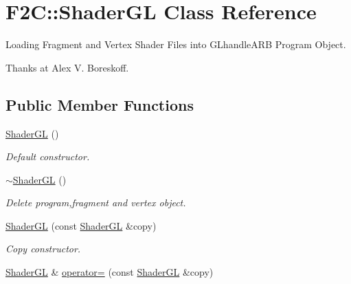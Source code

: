 \hypertarget{class_f2_c_1_1_shader_g_l}{
\section{F2C::ShaderGL Class Reference}
\label{class_f2_c_1_1_shader_g_l}
}


Loading Fragment and Vertex Shader Files into GLhandleARB Program Object. \par
 \par
 Thanks at Alex V. Boreskoff.  


\subsection*{Public Member Functions}
\begin{DoxyCompactItemize}
\item 
\hypertarget{class_f2_c_1_1_shader_g_l_a199175c733789ae58dc412cd717f2656}{
\hyperlink{class_f2_c_1_1_shader_g_l_a199175c733789ae58dc412cd717f2656}{ShaderGL} ()}
\label{class_f2_c_1_1_shader_g_l_a199175c733789ae58dc412cd717f2656}

\begin{DoxyCompactList}\small\item\em Default constructor. \item\end{DoxyCompactList}\item 
\hypertarget{class_f2_c_1_1_shader_g_l_ac45578d727ac4383bc3bc84804d99323}{
\hyperlink{class_f2_c_1_1_shader_g_l_ac45578d727ac4383bc3bc84804d99323}{$\sim$ShaderGL} ()}
\label{class_f2_c_1_1_shader_g_l_ac45578d727ac4383bc3bc84804d99323}

\begin{DoxyCompactList}\small\item\em Delete program,fragment and vertex object. \item\end{DoxyCompactList}\item 
\hypertarget{class_f2_c_1_1_shader_g_l_a309b6e62636d137bf14c35f0903f1502}{
\hyperlink{class_f2_c_1_1_shader_g_l_a309b6e62636d137bf14c35f0903f1502}{ShaderGL} (const \hyperlink{class_f2_c_1_1_shader_g_l}{ShaderGL} \&copy)}
\label{class_f2_c_1_1_shader_g_l_a309b6e62636d137bf14c35f0903f1502}

\begin{DoxyCompactList}\small\item\em Copy constructor. \item\end{DoxyCompactList}\item 
\hypertarget{class_f2_c_1_1_shader_g_l_ad14b6395e0733923590fa80baa74fae3}{
\hyperlink{class_f2_c_1_1_shader_g_l}{ShaderGL} \& \hyperlink{class_f2_c_1_1_shader_g_l_ad14b6395e0733923590fa80baa74fae3}{operator=} (const \hyperlink{class_f2_c_1_1_shader_g_l}{ShaderGL} \&copy)}
\label{class_f2_c_1_1_shader_g_l_ad14b6395e0733923590fa80baa74fae3}


\end{DoxyCompactItemize}
